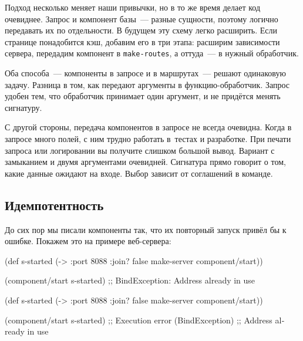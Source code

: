 \fi

Подход несколько меняет наши привычки, но в то же время делает код
очевиднее. Запрос и компонент базы~--- разные сущности, поэтому логично
передавать их по отдельности. В будущем эту схему легко расширить. Если странице
понадобится кэш, добавим его в три этапа: расширим зависимости сервера,
передадим компонент в \verb|make-routes|, а оттуда~--- в нужный обработчик.

Оба способа~--- компоненты в запросе и в маршрутах~--- решают одинаковую
задачу. Разница в том, как передают аргументы в функцию-обработчик. Запрос
удобен тем, что обработчик принимает один аргумент, и не придётся менять
сигнатуру.

С другой стороны, передача компонентов в запросе не всегда очевидна. Когда в
запросе много полей, с ним трудно работать в~тестах и разработке. При печати
запроса или логировании вы получите слишком большой вывод. Вариант с замыканием
и двумя аргументами очевидней. Сигнатура прямо говорит о том, какие данные
ожидают на входе. Выбор зависит от соглашений в команде.

\subsection{Идемпотентность}

До сих пор мы писали компоненты так, что их повторный запуск привёл бы к
ошибке. Покажем это на примере веб-сервера:

\ifx\DEVICETYPE\MOBILE

\begin{english}
  \begin{clojure}
(def s-started
  (-> {:port 8088 :join? false}
      make-server
      component/start))

(component/start s-started)
;; BindException: Address already in use
  \end{clojure}
\end{english}

\else

\begin{english}
  \begin{clojure}
(def s-started (-> {:port 8088 :join? false}
                    make-server
                    component/start))

(component/start s-started)
;; Execution error (BindException)
;; Address already in use
  \end{clojure}
\end{english}

